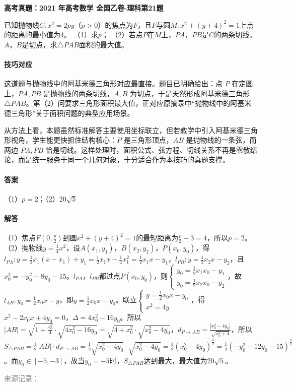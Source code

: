 \documentclass[UTF8,a4paper,11pt]{ctexart}
\newenvironment{gaokao}[1]{\par\medskip\noindent\textbf{高考真题：#1}\par\smallskip}{\par\medskip}
\begin{document}
\begin{gaokao}{2021 年高考数学 全国乙卷-理科第21题}

已知抛物线$C:x^2=2py$（$p>0$）的焦点为$F$，且$F$与圆$M:x^2+(y+4)^2=1$上点的距离的最小值为4。
（1）求$p$；
（2）若点$P$在$M$上，$PA$，$PB$是$C$的两条切线，$A$，$B$是切点，求$\triangle PAB$面积的最大值。

\paragraph{技巧对应}

这道题与抛物线中的阿基米德三角形对应最直接。题目已明确给出：点 $P$ 在定圆上，$PA,PB$ 是抛物线的两条切线，$A,B$ 为切点，于是天然形成阿基米德三角形 $\triangle PAB$。第（2）问要求三角形面积最大值，正对应原摘录中“抛物线中的阿基米德三角形”关于面积问题的典型应用场景。

从方法上看，本题虽然标准解答主要使用坐标联立，但若教学中引入阿基米德三角形视角，学生能更快抓住结构核心：$P$ 是三角形顶点，$AB$ 是抛物线的一条弦，而两边 $PA,PB$ 恰是切线。这样处理时，面积公式、弦方程、切线关系不再是零散结论，而是统一服务于同一个几何对象，十分适合作为本技巧的真题支撑。

\paragraph{答案}

（1）$p=2$；（2）$20\sqrt{5}$

\paragraph{解答}

（1）焦点$F(0,\frac{p}{2})$到圆$x^2+(y+4)^2=1$的最短距离为$\frac{p}{2}+3=4$，所以$p=2$。
（2）抛物线$y=\frac14x^2$，设$A(x_1,y_1)$，$B(x_2,y_2)$，$P(x_0,y_0)$，得$l_{PA}: y=\frac12x_1(x-x_1)+y_1=\frac12x_1x-\frac14x_1^2=\frac12x_1x-y_1$，$l_{PB}: y=\frac12x_2x-y_2$，且$x_0^2=-y_0^2-8y_0-15$。$l_{PA}$，$l_{PB}$都过点$P(x_0,y_0)$，则$\begin{cases} y_0=\frac12x_1x_0-y_1 \\ y_0=\frac12x_2x_0-y_2 \end{cases}$，故$l_{AB}: y_0=\frac12x_0x-y$，即$y=\frac12x_0x-y_0$。联立$\begin{cases} y=\frac12x_0x-y_0 \\ x^2=4y \end{cases}$，得$x^2-2x_0x+4y_0=0$，$\Delta=4x_0^2-16y_0$。所以$|AB|=\sqrt{1+\frac{x_0^2}{4}}\cdot\sqrt{4x_0^2-16y_0}=\sqrt{4+x_0^2}\cdot\sqrt{x_0^2-4y_0}$，$d_{P\to AB}=\frac{|x_0^2-4y_0|}{\sqrt{x_0^2+4}}$，所以$S_{\triangle PAB}=\frac12|AB|\cdot d_{P\to AB}=\frac12\sqrt{x_0^2-4y_0}\cdot\sqrt{x_0^2-4y_0}=\frac12(x_0^2-4y_0)^{\frac32}=\frac12(-y_0^2-12y_0-15)^{\frac32}$。而$y_0\in[-5,-3]$，故当$y_0=-5$时，$S_{\triangle PAB}$达到最大，最大值为$20\sqrt{5}$。

\par\smallskip\textcolor{gray}{\footnotesize 来源记录：\texttt{}}

\end{gaokao}
\end{document}
